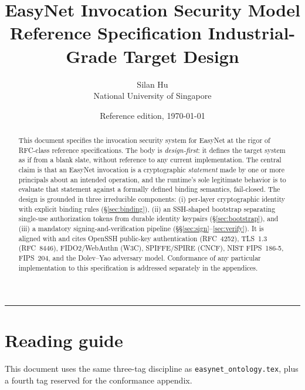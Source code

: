 \documentclass[11pt,a4paper]{article}
\title{
    \vspace{-2em}
    \textbf{\Large EasyNet Invocation Security Model}\\[0.3em]
    \large Reference Specification \textemdash{} Industrial-Grade Target
    Design
}
\author{
    Silan Hu \\ \small National University of Singapore
}
\date{Reference edition, \today}
\begin{document}
\maketitle

\begin{abstract}
\noindent
This document specifies the invocation security system for EasyNet at the
rigor of RFC-class reference specifications. The body is
\emph{design-first}: it defines the target system as if from a blank slate,
without reference to any current implementation. The central claim is that
an EasyNet invocation is a cryptographic \emph{statement} made by one or
more principals about an intended operation, and the runtime's sole
legitimate behavior is to evaluate that statement against a formally
defined binding semantics, fail-closed. The design is grounded in three
irreducible components: (i) per-layer cryptographic identity with
explicit binding rules (\S\ref{sec:binding}), (ii) an SSH-shaped
bootstrap separating single-use authorization tokens from durable
identity keypairs (\S\ref{sec:bootstrap}), and (iii) a mandatory
signing-and-verification pipeline (\S\S\ref{sec:sign}--\ref{sec:verify}).
It is aligned with and cites OpenSSH public-key authentication
(RFC~4252), TLS~1.3 (RFC~8446), FIDO2/WebAuthn (W3C), SPIFFE/SPIRE (CNCF),
NIST FIPS~186-5, FIPS~204, and the Dolev--Yao adversary model. Conformance
of any particular implementation to this specification is addressed
separately in the appendices.
\end{abstract}

\tableofcontents
\vspace{1em}
\hrule
\vspace{1em}

\section{Reading guide}
\label{sec:reading-guide}

This document uses the same three-tag discipline as
\texttt{easynet\_ontology.tex}, plus a fourth tag reserved for the
conformance appendix.
\end{document}
